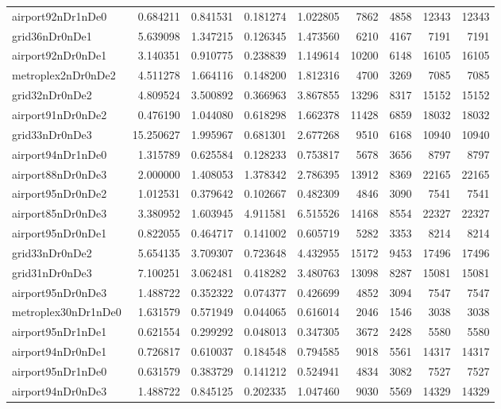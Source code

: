 \begin{longtable}{|l|r|r|r|r|r|r|r|r|}
airport92nDr1nDe0 & 0.684211 & 0.841531 & 0.181274 & 1.022805 & 7862 & 4858 & 12343 & 12343 \\
grid36nDr0nDe1 & 5.639098 & 1.347215 & 0.126345 & 1.473560 & 6210 & 4167 & 7191 & 7191 \\
airport92nDr0nDe1 & 3.140351 & 0.910775 & 0.238839 & 1.149614 & 10200 & 6148 & 16105 & 16105 \\
metroplex2nDr0nDe2 & 4.511278 & 1.664116 & 0.148200 & 1.812316 & 4700 & 3269 & 7085 & 7085 \\
grid32nDr0nDe2 & 4.809524 & 3.500892 & 0.366963 & 3.867855 & 13296 & 8317 & 15152 & 15152 \\
airport91nDr0nDe2 & 0.476190 & 1.044080 & 0.618298 & 1.662378 & 11428 & 6859 & 18032 & 18032 \\
grid33nDr0nDe3 & 15.250627 & 1.995967 & 0.681301 & 2.677268 & 9510 & 6168 & 10940 & 10940 \\
airport94nDr1nDe0 & 1.315789 & 0.625584 & 0.128233 & 0.753817 & 5678 & 3656 & 8797 & 8797 \\
airport88nDr0nDe3 & 2.000000 & 1.408053 & 1.378342 & 2.786395 & 13912 & 8369 & 22165 & 22165 \\
airport95nDr0nDe2 & 1.012531 & 0.379642 & 0.102667 & 0.482309 & 4846 & 3090 & 7541 & 7541 \\
airport85nDr0nDe3 & 3.380952 & 1.603945 & 4.911581 & 6.515526 & 14168 & 8554 & 22327 & 22327 \\
airport95nDr0nDe1 & 0.822055 & 0.464717 & 0.141002 & 0.605719 & 5282 & 3353 & 8214 & 8214 \\
grid33nDr0nDe2 & 5.654135 & 3.709307 & 0.723648 & 4.432955 & 15172 & 9453 & 17496 & 17496 \\
grid31nDr0nDe3 & 7.100251 & 3.062481 & 0.418282 & 3.480763 & 13098 & 8287 & 15081 & 15081 \\
airport95nDr0nDe3 & 1.488722 & 0.352322 & 0.074377 & 0.426699 & 4852 & 3094 & 7547 & 7547 \\
metroplex30nDr1nDe0 & 1.631579 & 0.571949 & 0.044065 & 0.616014 & 2046 & 1546 & 3038 & 3038 \\
airport95nDr1nDe1 & 0.621554 & 0.299292 & 0.048013 & 0.347305 & 3672 & 2428 & 5580 & 5580 \\
airport94nDr0nDe1 & 0.726817 & 0.610037 & 0.184548 & 0.794585 & 9018 & 5561 & 14317 & 14317 \\
airport95nDr1nDe0 & 0.631579 & 0.383729 & 0.141212 & 0.524941 & 4834 & 3082 & 7527 & 7527 \\
airport94nDr0nDe3 & 1.488722 & 0.845125 & 0.202335 & 1.047460 & 9030 & 5569 & 14329 & 14329 \\

\end{longtable}
